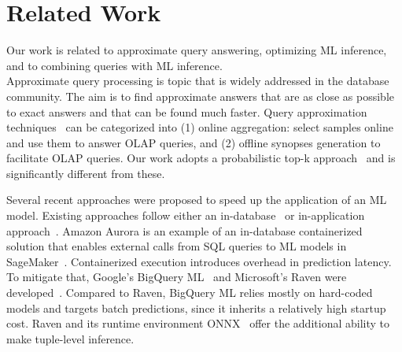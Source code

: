 \section{Related Work}
\label{sec:related}
Our work is related to approximate query answering, optimizing ML inference, and to combining queries with ML inference. \\

Approximate query processing is topic that is widely addressed in the database community. The aim is to find approximate answers that are as close as possible to exact answers and that can be found much faster. 
Query approximation techniques~\cite{DBLP:journals/dase/LiL18} can be categorized into (1) online aggregation: select samples online and use them to answer OLAP queries, and (2) offline synopses generation 
 to facilitate OLAP queries. Our work adopts a probabilistic top-k approach~\cite{DBLP:conf/vldb/TheobaldWS04} and is significantly different from these.

Several recent approaches were proposed to speed up the application of an ML model. 
Existing approaches follow either an in-database~\cite{DBLP:conf/nsdi/CrankshawWZFGS17} or in-application approach~\cite{DBLP:conf/kdd/AhmedABCCDDEFFG19}. Amazon Aurora is an example of an in-database containerized solution that enables external calls from SQL queries to ML models in SageMaker~\cite{sagemaker_2022}. 
Containerized execution introduces overhead in prediction latency. To mitigate that, Google's BigQuery ML~\cite{bigquery_2022}
and Microsoft's Raven were developed~\cite{DBLP:conf/cidr/KaranasosIPSPPX20}. Compared to Raven, BigQuery ML relies mostly on hard-coded models and targets batch predictions, since it inherits a relatively high startup cost. Raven and its runtime environment ONNX~\cite{DBLP:conf/osdi/ChenMJZYSCWHCGK18} offer the additional ability to make tuple-level inference. 

